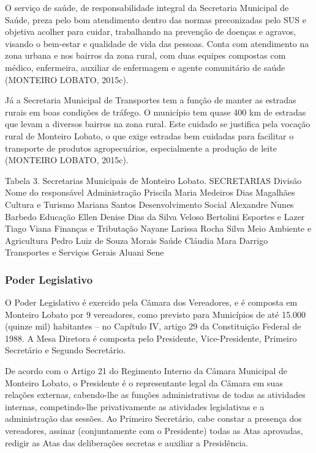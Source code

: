 O serviço de saúde, de responsabilidade integral da Secretaria Municipal de Saúde, preza pelo bom atendimento dentro das normas preconizadas pelo SUS e objetiva acolher para cuidar, trabalhando na prevenção de doenças e agravos, visando o bem-estar e qualidade de vida das pessoas. Conta com atendimento na zona urbana e nos bairros da zona rural, com duas equipes compostas com médico, enfermeira, auxiliar de enfermagem e agente comunitário de saúde (MONTEIRO LOBATO, 2015c).

Já a Secretaria Municipal de Transportes tem a função de manter as estradas rurais em boas condições de tráfego. O município tem quase 400 km de estradas que levam a diversos bairros na zona rural. Este cuidado se justifica pela vocação rural de Monteiro Lobato, o que exige estradas bem cuidadas para facilitar o transporte de produtos agropecuários, especialmente a produção de leite (MONTEIRO LOBATO, 2015c).

Tabela 3. Secretarias Municipais de Monteiro Lobato.
SECRETARIAS
Divisão	Nome do responsável
Administração	Priscila Maria Medeiros Dias Magalhães
Cultura e Turismo	Mariana Santos
Desenvolvimento Social	Alexandre Nunes Barbedo
Educação	Ellen Denise Dias da Silva Veloso Bertolini
Esportes e Lazer	Tiago Viana
Finanças e Tributação	Nayane Larissa Rocha Silva
Meio Ambiente e Agricultura	Pedro Luiz de Souza Morais
Saúde	Cláudia Mara Darrigo
Transportes e Serviços Gerais	Aluani Sene

\subsubsection{Poder Legislativo}
O Poder Legislativo é exercido pela Câmara dos Vereadores, e é composta em Monteiro Lobato por 9 vereadores, como previsto para Municípios de até 15.000 (quinze mil) habitantes – no Capítulo IV, artigo 29 da Constituição Federal de 1988. A Mesa Diretora é composta pelo Presidente, Vice-Presidente, Primeiro Secretário e Segundo Secretário.

De acordo com o Artigo 21 do Regimento Interno da Câmara Municipal de Monteiro Lobato, o Presidente é o representante legal da Câmara em suas relações externas, cabendo-lhe as funções administrativas de todas as atividades internas, competindo-lhe privativamente as atividades legislativas e a administração das sessões. Ao Primeiro Secretário, cabe constar a presença dos vereadores, assinar (conjuntamente com o Presidente) todas as Atas aprovadas, redigir as Atas das deliberações secretas e auxiliar a Presidência.

